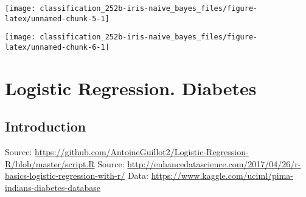 \documentclass[]{book}
\newenvironment{Shaded}{\begin{snugshade}}{\end{snugshade}}
\newcommand{\CommentTok}[1]{\textcolor[rgb]{0.56,0.35,0.01}{\textit{#1}}}
\newcommand{\DataTypeTok}[1]{\textcolor[rgb]{0.13,0.29,0.53}{#1}}
\newcommand{\DecValTok}[1]{\textcolor[rgb]{0.00,0.00,0.81}{#1}}
\newcommand{\FloatTok}[1]{\textcolor[rgb]{0.00,0.00,0.81}{#1}}
\newcommand{\KeywordTok}[1]{\textcolor[rgb]{0.13,0.29,0.53}{\textbf{#1}}}
\newcommand{\NormalTok}[1]{#1}
\newcommand{\OperatorTok}[1]{\textcolor[rgb]{0.81,0.36,0.00}{\textbf{#1}}}
\newcommand{\StringTok}[1]{\textcolor[rgb]{0.31,0.60,0.02}{#1}}
\begin{document}
\begin{center}\texttt{[image: classification\_252b-iris-naive\_bayes\_files/figure-latex/unnamed-chunk-5-1]} \end{center}

\begin{Shaded}
\end{Shaded}

\begin{center}\texttt{[image: classification\_252b-iris-naive\_bayes\_files/figure-latex/unnamed-chunk-6-1]} \end{center}

\hypertarget{logistic-regression.-diabetes}{%
\chapter{Logistic Regression. Diabetes}\label{logistic-regression.-diabetes}}

\hypertarget{introduction-4}{%
\section{Introduction}\label{introduction-4}}

Source: \url{https://github.com/AntoineGuillot2/Logistic-Regression-R/blob/master/script.R}
Source: \url{http://enhancedatascience.com/2017/04/26/r-basics-logistic-regression-with-r/}
Data: \url{https://www.kaggle.com/uciml/pima-indians-diabetes-database}
\end{document}
